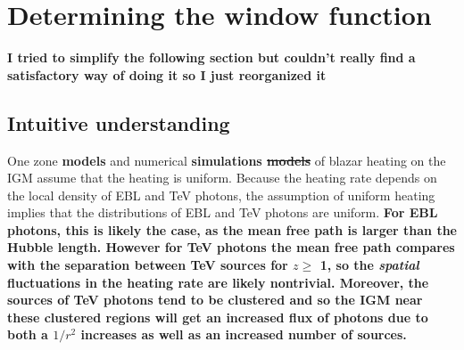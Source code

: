 \documentclass[twocolumns]{emulateapj}
\newcommand\ALc[1]{{\color{red} \bf #1}} %
\begin{document}











\section {Determining the window function}\label{window}
\ALc{I tried to simplify the following section but couldn't really find a satisfactory way of doing it so I just reorganized it}
\ALc{\subsection{Intuitive understanding}}
One zone \ALc{models} \citep{2012ApJ...752...23C,2012ApJ...752...24P} and numerical \ALc{simulations \sout{models}} \citep{2012MNRAS.423..149P} of blazar heating on the IGM assume that the heating is uniform.  Because the heating rate depends on the local density of EBL and TeV photons, the assumption of uniform heating implies that the distributions of EBL and TeV photons are uniform.  \ALc{For EBL photons, this is likely the case, as the mean free path is larger than the Hubble length. However for TeV photons the mean free path compares with the separation between TeV sources for $z\geqslant$ 1, so the {\it spatial} fluctuations in the heating rate are likely nontrivial. Moreover, the sources of TeV photons tend to be clustered and so the IGM near these clustered regions will get an increased flux of photons due to both a $1/r^2$ increases as well as an increased number of sources.}  
\end{document}
